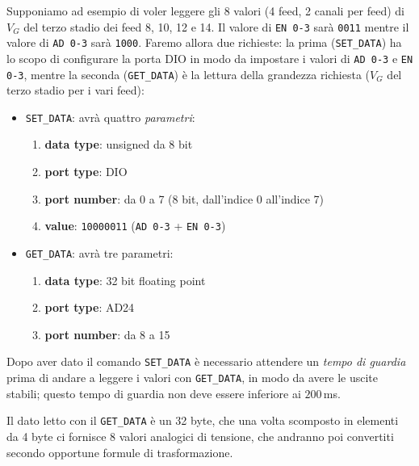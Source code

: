 Supponiamo ad esempio di voler leggere gli 8 valori (4 feed, 2 canali per feed) di $V_G$ del terzo 
stadio dei feed 8, 10, 12 e 14. Il valore di \texttt{EN 0-3} sar\`a \texttt{0011} mentre il valore 
di \texttt{AD 0-3} sar\`a \texttt{1000}. Faremo allora due richieste: la prima (\texttt{SET\_DATA}) 
ha lo scopo di configurare la porta DIO in modo da impostare i valori di 
\texttt{AD 0-3} e \texttt{EN 0-3}, mentre la seconda (\texttt{GET\_DATA}) \`e la lettura della 
grandezza richiesta ($V_G$ del terzo stadio per i vari feed):
\begin{itemize}
\item \texttt{SET\_DATA}: avr\`a quattro \emph{parametri}:
\begin{enumerate}
\item \textbf{data type}: unsigned da 8 bit
\item \textbf{port type}: DIO
\item \textbf{port number}: da 0 a 7 (8 bit, dall'indice 0 all'indice 7)
\item \textbf{value}: \texttt{10000011} (\texttt{AD 0-3} + \texttt{EN 0-3})
\end{enumerate}
\item \texttt{GET\_DATA}: avr\`a tre parametri:
\begin{enumerate}
\item \textbf{data type}: 32 bit floating point
\item \textbf{port type}: AD24
\item \textbf{port number}: da 8 a 15
\end{enumerate}
\end{itemize}
Dopo aver dato il comando \texttt{SET\_DATA} \`e necessario attendere un \emph{tempo di guardia} prima di
andare a leggere i valori con \texttt{GET\_DATA}, in modo da avere le uscite stabili; questo
tempo di guardia non deve essere inferiore ai $200$\,ms.

Il dato letto con il \texttt{GET\_DATA} \`e un 32 byte, che una volta scomposto in elementi da 4 byte ci fornisce
8 valori analogici di tensione, che andranno poi convertiti secondo opportune formule di trasformazione.


